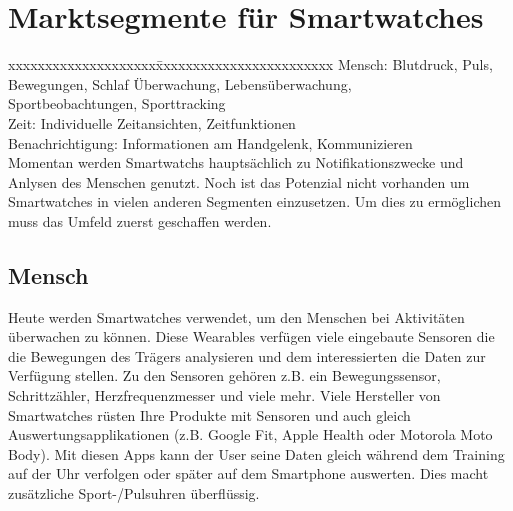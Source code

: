\section{Marktsegmente für Smartwatches}
\begin{tabbing}
xxxxxxxxxxxxxxxxxxxx\=xxxxxxxxxxxxxxxxxxxxxxxx	\kill
Mensch:		          \> Blutdruck, Puls, Bewegungen, Schlaf Überwachung, Lebensüberwachung, \\\>Sportbeobachtungen, Sporttracking \\
Zeit:			          \> Individuelle Zeitansichten, Zeitfunktionen \\
Benachrichtigung:	  \> Informationen am Handgelenk, Kommunizieren \\

Momentan werden Smartwatchs hauptsächlich zu Notifikationszwecke und Anlysen des Menschen genutzt. Noch ist das Potenzial nicht vorhanden um Smartwatches in vielen anderen Segmenten einzusetzen. Um dies zu ermöglichen muss das Umfeld zuerst geschaffen werden.
\end{tabbing}

\subsection{Mensch}
Heute werden Smartwatches verwendet, um den Menschen bei Aktivitäten überwachen zu können. Diese Wearables verfügen viele eingebaute Sensoren die die Bewegungen des Trägers analysieren und dem interessierten die Daten zur Verfügung stellen. Zu den Sensoren gehören z.B. ein Bewegungssensor, Schrittzähler, Herzfrequenzmesser und viele mehr.
Viele Hersteller von Smartwatches rüsten Ihre Produkte mit Sensoren und auch gleich Auswertungsapplikationen (z.B. Google Fit, Apple Health oder Motorola Moto Body).
Mit diesen Apps kann der User seine Daten gleich während dem Training auf der Uhr verfolgen oder später auf dem Smartphone auswerten. Dies macht zusätzliche Sport-/Pulsuhren überflüssig.

